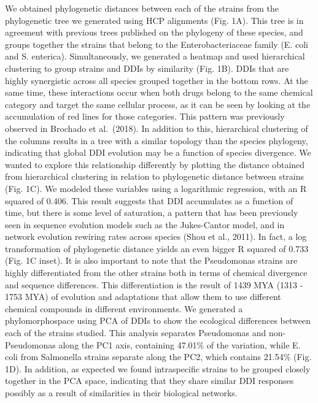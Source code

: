 \documentclass[]{elsarticle} %
\begin{document}
We obtained phylogenetic distances between each of the strains from the phylogenetic tree we generated using HCP alignments (Fig. 1A). This tree is in agreement with previous trees published on the phylogeny of these species, and groups together the strains that belong to the Enterobacteriaceae family (E. coli and S. enterica). Simultaneously, we generated a heatmap and used hierarchical clustering to group strains and DDIs by similarity (Fig. 1B). DDIs that are highly synergistic across all species grouped together in the bottom rows. At the same time, these interactions occur when both drugs belong to the same chemical category and target the same cellular process, as it can be seen by looking at the accumulation of red lines for those categories. This pattern was previously observed in Brochado et al.~(2018). In addition to this, hierarchical clustering of the columns results in a tree with a similar topology than the species phylogeny, indicating that global DDI evolution may be a function of species divergence. We wanted to explore this relationship differently by plotting the distance obtained from hierarchical clustering in relation to phylogenetic distance between strains (Fig. 1C). We modeled these variables using a logarithmic regression, with an R squared of 0.406. This result suggests that DDI accumulates as a function of time, but there is some level of saturation, a pattern that has been previously seen in sequence evolution models such as the Jukes-Cantor model, and in network evolution rewiring rates across species (Shou et al., 2011). In fact, a log transformation of phylogenetic distance yields an even bigger R squared of 0.733 (Fig. 1C inset). It is also important to note that the Pseudomonas strains are highly differentiated from the other strains both in terms of chemical divergence and sequence differences. This differentiation is the result of 1439 MYA (1313 - 1753 MYA) of evolution and adaptations that allow them to use different chemical compounds in different environments. We generated a phylomorphospace using PCA of DDIs to show the ecological differences between each of the strains studied. This analysis separates Pseudomonas and non-Pseudomonas along the PC1 axis, containing 47.01\% of the variation, while E. coli from Salmonella strains separate along the PC2, which contains 21.54\% (Fig. 1D). In addition, as expected we found intraspecific strains to be grouped closely together in the PCA space, indicating that they share similar DDI responses possibly as a result of similarities in their biological networks.
\end{document}
